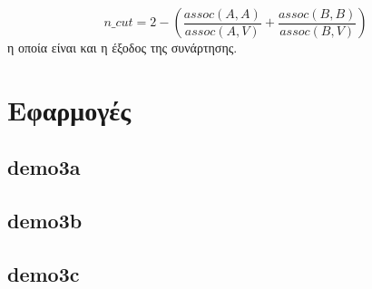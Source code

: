 \documentclass{article}
\begin{document}
\begin{equation}
    n\_cut = 2 - \left(\frac{assoc(A,A)}{assoc(A,V)} + \frac{assoc(B,B)}{assoc(B,V)}\right)
\end{equation}
η οποία είναι και η έξοδος της συνάρτησης.
\section{Εφαρμογές}
\subsection{demo3a} 
\subsection{demo3b}
\subsection{demo3c}
\end{document}
